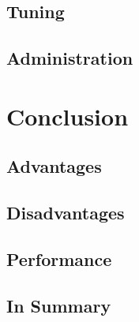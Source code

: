 \documentclass[titlepage, a4paper, 11pt]{scrartcl}
\begin{document}

        \subsection{Tuning}


        \subsection{Administration}


    \section{Conclusion}

        \subsection{Advantages}


        \subsection{Disadvantages}


        \subsection{Performance}
    


        \subsection{In Summary}

      

            
    
\end{document}
